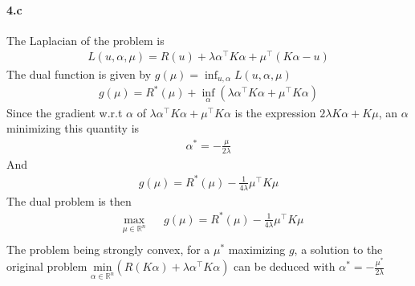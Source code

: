 \documentclass[10pt]{article}
\begin{document}
    \paragraph{4.c} The Laplacian of the problem is 
    \begin{align*}
        L(u, \alpha, \mu) = R(u) + \lambda \alpha^\top K \alpha + \mu^\top (
        K\alpha - u)
    \end{align*}
    The dual function is given by $g(\mu) = \inf_{u, \alpha} L(u, \alpha, \mu)$
    \begin{align*}
        g(\mu) = R^*(\mu) + \inf_{\alpha}(\lambda\alpha^\top K \alpha + 
        \mu^\top K\alpha)
    \end{align*}
    Since the gradient w.r.t $\alpha$ of $\lambda\alpha^\top K \alpha + 
    \mu^\top K\alpha$ is the expression $2\lambda K \alpha  + K\mu$, an $\alpha$
    minimizing this quantity is 
    \begin{align*}
        \alpha^* = -\frac{\mu}{2\lambda}
    \end{align*} 
    And 
    \begin{align*}
        g(\mu) = R^*(\mu) - \frac{1}{4\lambda}\mu^\top K \mu
    \end{align*}
    The dual problem is then
    \begin{equation*}
        \begin{aligned}
        & \underset{\mu\in\mathbb{R}^n}{\text{max}}
        & & g(\mu) = R^*(\mu) - \frac{1}{4\lambda}\mu^\top K \mu\\
        \end{aligned}
    \end{equation*} 
    The problem being strongly convex, for a $\mu^*$ maximizing $g$, a solution 
    to the original problem 
    $\underset{\alpha\in\mathbb{R}^n}{\text{min}} (R(K\alpha) + 
    \lambda \alpha^\top K \alpha)$
    can be deduced with $\alpha^* = -\frac{\mu^*}{2\lambda}$
\end{document}
